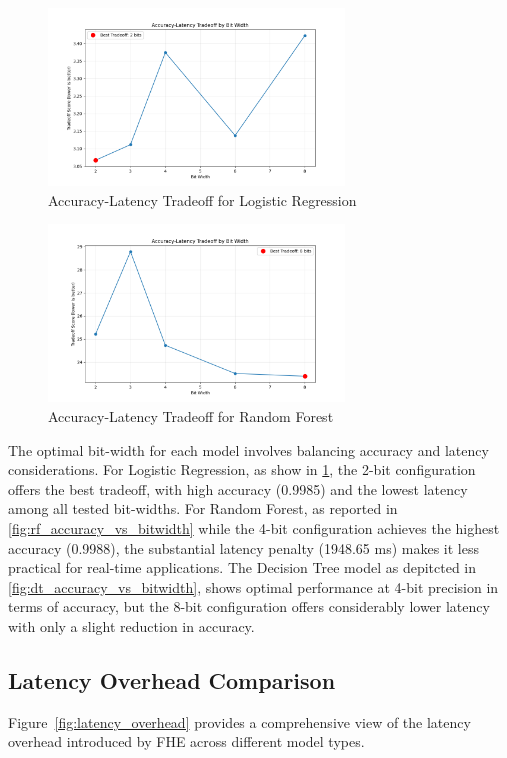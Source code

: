 \documentclass[a4paper,12pt]{article}
\begin{document}
\begin{figure}[h]
\centering
\includegraphics[width=0.7\textwidth]{results/lr/lr_tradeoff.png}
\caption{Accuracy-Latency Tradeoff for Logistic Regression}
\label{fig:lr_accuracy_latency_tradeoff}
\end{figure}

\begin{figure}[h]
\centering
\includegraphics[width=0.7\textwidth]{results/rf/rf_tradeoff.png}
\caption{Accuracy-Latency Tradeoff for Random Forest}
\label{fig:rf_accuracy_latency_tradeoff}
\end{figure}
The optimal bit-width for each model involves balancing accuracy and latency considerations.
For Logistic Regression, as show in \ref{fig:lr_accuracy_latency_tradeoff}, the 2-bit configuration offers the best tradeoff, with high accuracy (0.9985) and the lowest latency among all tested bit-widths. 
For Random Forest, as reported in \ref{fig:rf_accuracy_vs_bitwidth} while the 4-bit configuration achieves the highest accuracy (0.9988), the substantial latency penalty (1948.65 ms) makes it less practical for real-time applications. 
The Decision Tree model as depitcted in \ref{fig:dt_accuracy_vs_bitwidth}, shows optimal performance at 4-bit precision in terms of accuracy, but the 8-bit configuration offers considerably lower latency with only a slight reduction in accuracy.


\subsection{Latency Overhead Comparison}
Figure~\ref{fig:latency_overhead} provides a comprehensive view of the latency overhead introduced by FHE across different model types.
\end{document}
